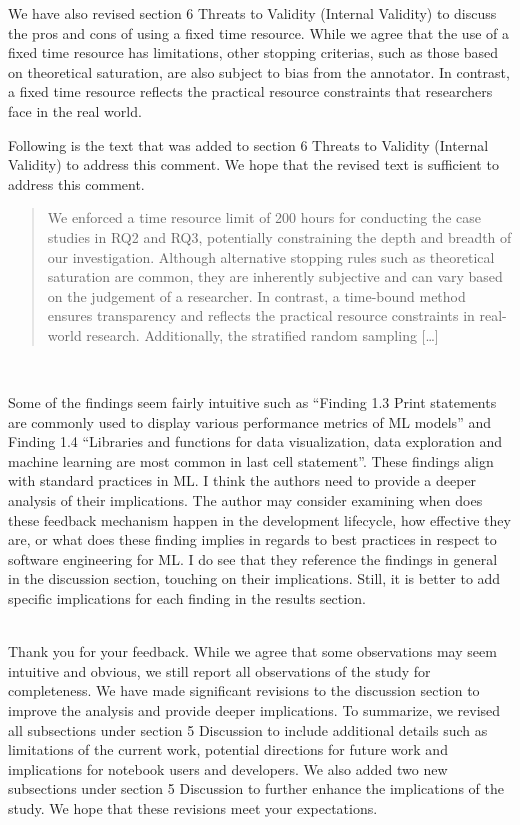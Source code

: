 \documentclass[11pt,fleqn]{article}
\newcommand{\eline}{\vspace*{.75\baselineskip}}
\newcommand{\Referee}[1]{\eline \noindent {\bf Reviewer comment #1:} \\}
\newcommand{\Us}{\eline \noindent {\bf Response:}\\}
\newenvironment{revcomment}[1][]
{\Referee{#1}\begin{rcomment}}
{\end{rcomment}}
\begin{document}
We have also revised section 6 Threats to Validity (Internal Validity) to discuss the pros and cons of using a fixed time resource. While we agree that the use of a fixed time resource has limitations, other stopping criterias, such as those based on theoretical saturation, are also subject to bias from the annotator. In contrast, a fixed time resource reflects the practical resource constraints that researchers face in the real world.

Following is the text that was added to section 6 Threats to Validity (Internal Validity) to address this comment. We hope that the revised text is sufficient to address this comment.

\begin{quote}
  We enforced a time resource limit of 200 hours for conducting the case studies in RQ2 and RQ3, potentially constraining the depth and breadth of our investigation. Although alternative stopping rules such as theoretical saturation are common, they are inherently subjective and can vary based on the judgement of a researcher. In contrast, a time-bound method ensures transparency and reflects the practical resource constraints in real-world research. Additionally, the stratified random sampling [\ldots]
\end{quote}

\begin{revcomment}[3.8]
  Some of the findings seem fairly intuitive such as ``Finding 1.3 Print statements are commonly used to display various performance metrics of ML models'' and Finding 1.4 ``Libraries and functions for data visualization, data exploration and machine learning are most common in last cell statement''. These findings align with standard practices in ML. I think the authors need to provide a deeper analysis of their implications. The author may consider examining when does these feedback mechanism happen in the development lifecycle, how effective they are, or what does these finding implies in regards to best practices in respect to software engineering for ML. I do see that they reference the findings in general in the discussion section, touching on their implications. Still, it is better to add specific implications for each finding in the results section.
\end{revcomment}

\Us Thank you for your feedback. While we agree that some observations may seem intuitive and obvious, we still report all observations of the study for completeness. We have made significant revisions to the discussion section to improve the analysis and provide deeper implications. To summarize, we revised all subsections under section 5 Discussion to include additional details such as limitations of the current work, potential directions for future work and implications for notebook users and developers. We also added two new subsections under section 5 Discussion to further enhance the implications of the study. We hope that these revisions meet your expectations.
\end{document}
